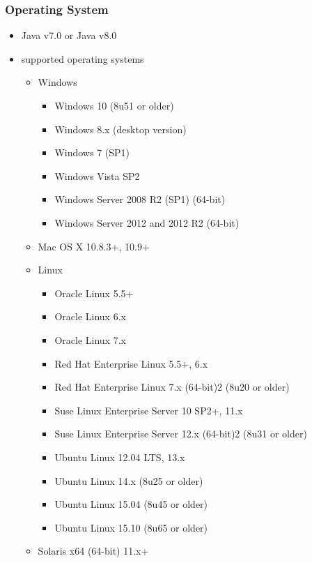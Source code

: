 \subsubsection{Operating System}
\begin{itemize}
  \item Java v7.0 or Java v8.0
  \item supported operating systems
     \begin{itemize}
       \item Windows
       \begin{itemize}
         \item Windows 10 (8u51 or older)
         \item Windows 8.x (desktop version)
         \item Windows 7 (SP1)
         \item Windows Vista SP2
         \item Windows Server 2008 R2 (SP1) (64-bit)
         \item Windows Server 2012 and 2012 R2 (64-bit)
       \end{itemize}
     
       \item Mac OS X 10.8.3+, 10.9+
       
       \item Linux
       \begin{itemize}
         \item Oracle Linux 5.5+
         \item Oracle Linux 6.x
         \item Oracle Linux 7.x
         \item Red Hat Enterprise Linux 5.5+, 6.x 
         \item Red Hat Enterprise Linux 7.x (64-bit)2 (8u20 or older)
         \item Suse Linux Enterprise Server 10 SP2+, 11.x
         \item Suse Linux Enterprise Server 12.x (64-bit)2 (8u31 or older)
         \item Ubuntu Linux 12.04 LTS, 13.x
         \item Ubuntu Linux 14.x (8u25 or older)
         \item Ubuntu Linux 15.04 (8u45 or older)
         \item Ubuntu Linux 15.10 (8u65 or older)
       \end{itemize}
       
       \item Solaris x64 (64-bit) 11.x+
     
   \end{itemize}
     
\end{itemize}


